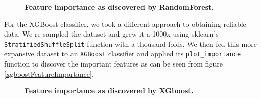 \documentclass[twoside,openright,titlepage,numbers=noenddot,headinclude,%
               footinclude=true,cleardoublepage=empty,abstractoff,BCOR=5mm,%
               paper=a4,fontsize=11pt,ngerman,american]{scrreprt}
\numberwithin{theorem}{chapter}
\numberwithin{definition}{chapter}
\numberwithin{algorithm}{chapter}
\numberwithin{figure}{chapter}
\numberwithin{table}{chapter}
\numberwithin{equation}{chapter}
\begin{document}
\begin{figure}[!hbtp]
\centering
    
    \caption{\textbf{Feature importance as discovered by RandomForest.} \textit{}}
\end{figure}

For the XGBoost classifier, we took a different approach to obtaining reliable data. We re-sampled the dataset and grew it a 1000x using sklearn's \texttt{StratifiedShuffleSplit} function with a thousand folds. We then fed this more expansive dataset to an \texttt{XGBoost} classifier and applied its \texttt{plot\_importance} function to discover the important features as can be seen from figure \ref{xgboostFeatureImportance}.

\begin{figure}[!hbtp]
\centering
    
    \caption{\textbf{Feature importance as discovered by XGboost.} \textit{}}
\end{figure}
\end{document}
